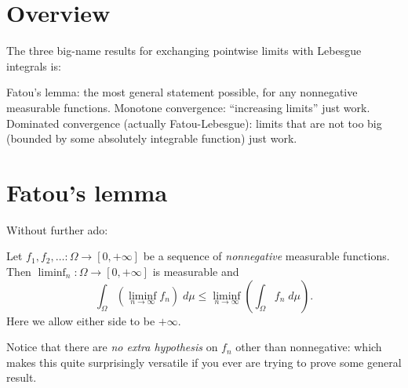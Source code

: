 \section{Overview}
The three big-name results for exchanging
pointwise limits with Lebesgue integrals is:
\begin{itemize}
	\ii Fatou's lemma: the most general statement possible,
	for any nonnegative measurable functions.
	\ii Monotone convergence: ``increasing limits'' just work.
	\ii Dominated convergence (actually Fatou-Lebesgue):
	limits that are not too big
	(bounded by some absolutely integrable function) just work.
\end{itemize}

\section{Fatou's lemma}
Without further ado:
\begin{lemma}
	Let $f_1, f_2, \dots \colon \Omega \to [0,+\infty]$
	be a sequence of \emph{nonnegative} measurable functions.
	Then $\liminf_n \colon \Omega \to [0,+\infty]$ is measurable and
	\[ \int_\Omega \left( \liminf_{n \to \infty} f_n \right) \; d\mu
		\le \liminf_{n \to \infty} \left( \int_\Omega f_n \; d\mu \right).  \]
	Here we allow either side to be $+\infty$.
\end{lemma}
Notice that there are \emph{no extra hypothesis}
on $f_n$ other than nonnegative: which makes this quite surprisingly versatile
if you ever are trying to prove some general result.

